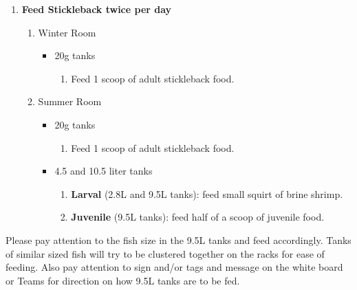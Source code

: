 \documentclass[
  letterpaper,
  DIV=11,
  numbers=noendperiod]{scrreprt}
\providecommand{\tightlist}{%
  \setlength{\itemsep}{0pt}\setlength{\parskip}{0pt}}\usepackage{longtable,booktabs,array}
\begin{document}
\begin{enumerate}
\def\labelenumi{\arabic{enumi}.}
\setcounter{enumi}{2}
\item
  \textbf{Feed Stickleback twice per day}

  \begin{enumerate}
  \def\labelenumii{\arabic{enumii}.}
  \tightlist
  \item
    Winter Room

    \begin{itemize}
    \tightlist
    \item
      20g tanks

      \begin{enumerate}
      \def\labelenumiii{\arabic{enumiii}.}
      \tightlist
      \item
        Feed 1 scoop of adult stickleback food.
      \end{enumerate}
    \end{itemize}
  \item
    Summer Room

    \begin{itemize}
    \tightlist
    \item
      20g tanks

      \begin{enumerate}
      \def\labelenumiii{\arabic{enumiii}.}
      \tightlist
      \item
        Feed 1 scoop of adult stickleback food.
      \end{enumerate}
    \item
      4.5 and 10.5 liter tanks

      \begin{enumerate}
      \def\labelenumiii{\arabic{enumiii}.}
      \tightlist
      \item
        \textbf{Larval} (2.8L and 9.5L tanks): feed small squirt of
        brine shrimp.
      \item
        \textbf{Juvenile} (9.5L tanks): feed half of a scoop of juvenile
        food.
      \end{enumerate}
    \end{itemize}
  \end{enumerate}
\end{enumerate}

\begin{tcolorbox}[enhanced jigsaw, toprule=.15mm, breakable, coltitle=black, leftrule=.75mm, title=\textcolor{quarto-callout-warning-color}{\faExclamationTriangle}\hspace{0.5em}{NOTES}, bottomrule=.15mm, toptitle=1mm, bottomtitle=1mm, colframe=quarto-callout-warning-color-frame, opacityback=0, colback=white, opacitybacktitle=0.6, colbacktitle=quarto-callout-warning-color!10!white, rightrule=.15mm, titlerule=0mm, arc=.35mm, left=2mm]

Please pay attention to the fish size in the 9.5L tanks and feed
accordingly. Tanks of similar sized fish will try to be clustered
together on the racks for ease of feeding. Also pay attention to sign
and/or tags and message on the white board or Teams for direction on how
9.5L tanks are to be fed.

\end{tcolorbox}
\end{document}
